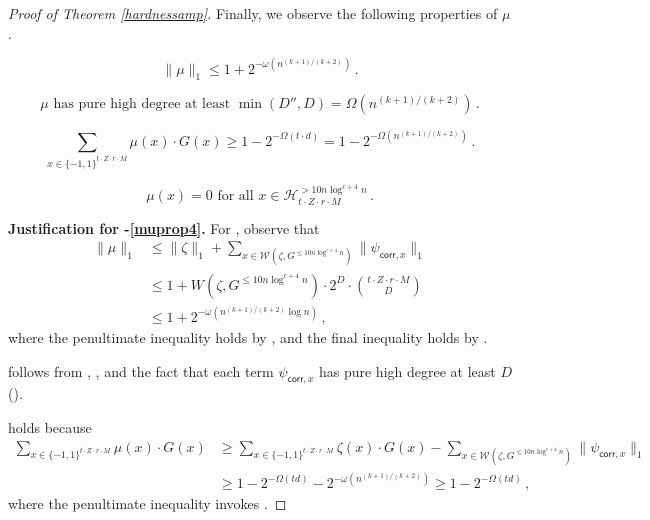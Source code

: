 \documentclass{toc}
\newcommand{\bits}{\{-1,1\}}
\begin{document}
\begin{proof}[Proof of Theorem \ref{hardnessamp}]
%
%
%
%
Finally, we observe the following properties of $\mu$. %
	
	\begin{equation}\label{muprop1}
	\|\mu\|_1\leq 1 + 2^{-\omega(n^{(k+1)/(k+2)})}\,.
	\end{equation}
	
	\begin{equation}\label{muprop2}
	\mu \text{ has pure high degree at least }  \min(D'', D) = \Omega\left(n^{(k+1)/(k+2)}\right)\,.
	\end{equation}
	
	\begin{equation}\label{muprop3}
	\sum_{x\in\bits^{t \cdot Z \cdot r \cdot M}} \mu(x) \cdot G(x)  \geq 1-2^{-\Omega(t \cdot d)} = 1-2^{-\Omega\left(n^{(k+1)/(k+2)}\right)}\,.
	\end{equation}
	
	\begin{equation}\label{muprop4}
	\mu(x)=0 \text{ for all } x \in \mathcal{H}_{t \cdot Z \cdot r \cdot M}^{> 10 n \log^{c+4} n}\,.
	\end{equation}
	
	\medskip \noindent \textbf{Justification for -\eqref{muprop4}.}
	For , observe that 
	\begin{align*}\|\mu\|_1 &\leq \|\zeta\|_1 + \sum_{x \in \mathcal{W}(\zeta, G^{\leq 10 n \log^{c+4} n})} \|\psi_{\mathsf{corr}, x}\|_1\\
	&\leq 1 + W(\zeta, G^{\leq 10 n \log^{c+4} n}) \cdot 2^D \cdot {t \cdot Z \cdot r \cdot M \choose D}  \\&\leq
	1 + 2^{-\omega\left(n^{(k+1)/(k+2)} \log n\right)}\,,
	\end{align*}
	where the penultimate inequality holds by  , and the final inequality holds by .
	
 follows from , , and the fact that each term $\psi_{\mathsf{corr}, x}$ has pure high degree at least $D$ ().
	
	 holds because \begin{align*} \sum_{x\in\bits^{t \cdot Z \cdot r \cdot M}} \mu(x) \cdot G(x)
	&\geq \sum_{x\in\bits^{t \cdot Z \cdot r \cdot M}} \zeta(x) \cdot G(x) - \sum_{x \in \mathcal{W}\left(\zeta, G^{\leq 10 n \log^{c+4} n}\right)} \|\psi_{\mathsf{corr},x}\|_1\\
	&\geq 1 - 2^{-\Omega(td)} -  2^{-\omega(n^{(k+1)/(k+2)})} \geq 1 - 2^{-\Omega(td)}\,,\end{align*}
	where the penultimate inequality invokes  .
	

\end{proof}
\end{document}
